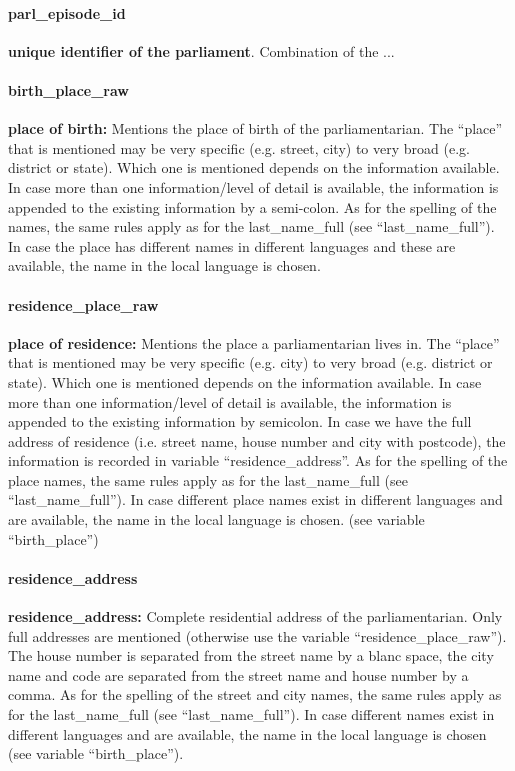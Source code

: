 \documentclass{article}
\begin{document}
\paragraph{parl\_episode\_id}
    \textbf{unique identifier of the parliament}. Combination of the ...

\paragraph{birth\_place\_raw}
    \textbf{place of birth:} Mentions the place of birth of the parliamentarian. The ``place” that is mentioned may be very specific (e.g. street, city) to very broad (e.g. district or state). Which one is mentioned depends on the information available. In case more than one information/level of detail is available, the information is appended to the existing information by a semi-colon. As for the spelling of the names, the same rules apply as for the last\_name\_full (see ``last\_name\_full''). In case the place has different names in different languages and these are available, the name in the local language is chosen.

\paragraph{residence\_place\_raw}
    \textbf{place of residence:} Mentions the place a parliamentarian lives in. The ``place” that is mentioned may be very specific (e.g. city) to very broad (e.g. district or state). Which one is mentioned depends on the information available. In case more than one information/level of detail is available, the information is appended to the existing information by semicolon. In case we have the full address of residence (i.e. street name, house number and city with postcode), the information is recorded in variable ``residence\_address”. As for the spelling of the place names, the same rules apply as for the last\_name\_full (see ``last\_name\_full''). In case different place names exist in different languages and are available, the name in the local language is chosen. (see variable ``birth\_place”)

\paragraph{residence\_address}
    \textbf{residence\_address:} Complete residential address of the parliamentarian. Only full addresses are mentioned (otherwise use the variable ``residence\_place\_raw”). The house number is separated from the street name by a blanc space, the city name and code are separated from the street name and house number by a comma. As for the spelling of the street and city names, the same rules apply as for the last\_name\_full (see ``last\_name\_full''). In case different names exist in different languages and are available, the name in the local language is chosen (see variable ``birth\_place”).
    
\end{document}
